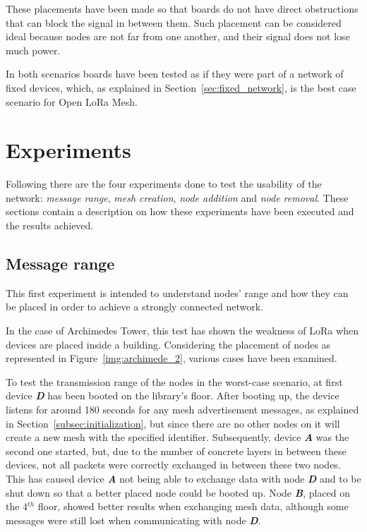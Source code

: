 		These placements have been made so that boards do not have direct obstructions that can block the signal in between them.
		Such placement can be considered ideal because nodes are not far from one another, and their signal does not lose much power.

		In both scenarios boards have been tested as if they were part of a network of fixed devices, which, as explained in Section~\ref{sec:fixed_network}, is the best case scenario for Open LoRa Mesh.
	
	\section{Experiments}
		
		Following there are the four experiments done to test the usability of the network: \textit{message range}, \textit{mesh creation}, \textit{node addition} and \textit{node removal}.
		These sections contain a description on how these experiments have been executed and the results achieved.
		
		\subsection{Message range}
		
			This first experiment is intended to understand nodes' range and how they can be placed in order to achieve a strongly connected network.
			
			In the case of Archimedes Tower, this test has shown the weakness of LoRa when devices are placed inside a building.
			Considering the placement of nodes as represented in Figure~\ref{img:archimede_2}, various cases have been examined.
			
			To test the transmission range of the nodes in the worst-case scenario, at first device \textbf{\textit{D}} has been booted on the library's floor.
			After booting up, the device listens for around 180 seconds for any mesh advertisement messages, as explained in Section~\ref{subsec:initialization}, but since there are no other nodes on it will create a new mesh with the specified identifier.
			Subsequently, device \textbf{\textit{A}} was the second one started, but, due to the number of concrete layers in between these devices, not all packets were correctly exchanged in between these two nodes.
			This has caused device \textbf{\textit{A}} not being able to exchange data with node \textbf{\textit{D}} and to be shut down so that a better placed node could be booted up.
			Node \textbf{\textit{B}}, placed on the 4$^{th}$ floor, showed better results when exchanging mesh data, although some messages were still lost when communicating with node \textbf{\textit{D}}.
			
